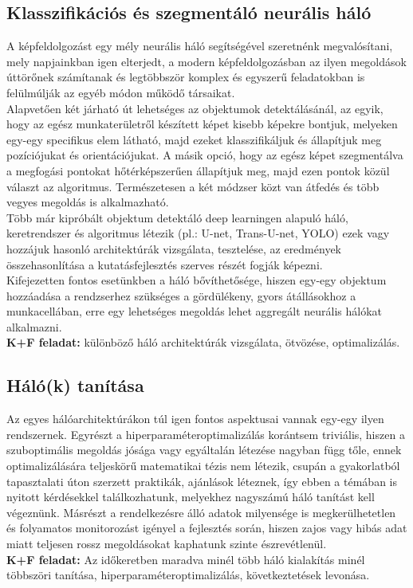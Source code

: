 \documentclass{article}
\begin{document}
\subsection{Klasszifikációs és szegmentáló neurális háló}
A képfeldolgozást egy mély neurális háló segítségével szeretnénk megvalósítani, mely napjainkban
igen elterjedt, a modern képfeldolgozásban az ilyen megoldások úttörőnek számítanak és 
legtöbbször komplex és egyszerű feladatokban is felülmúlják az egyéb módon működő társaikat.\\
Alapvetően két járható út lehetséges az objektumok detektálásánál, az egyik, hogy az egész
munkaterületről készített képet kisebb képekre bontjuk, melyeken egy-egy specifikus elem
látható, majd ezeket klasszifikáljuk és állapítjuk meg pozíciójukat és orientációjukat. A
másik opció, hogy az egész képet szegmentálva a megfogási pontokat hőtérképszerűen állapítjuk meg,
majd ezen pontok közül választ az algoritmus. Természetesen a két módzser közt van átfedés 
és több vegyes megoldás is alkalmazható.\\
Több már kipróbált objektum detektáló deep learningen alapuló háló, keretrendszer és algoritmus
létezik (pl.: U-net, Trans-U-net, YOLO) ezek vagy hozzájuk hasonló architektúrák vizsgálata,
tesztelése, az eredmények összehasonlítása a kutatásfejlesztés szerves részét fogják képezni.\\
Kifejezetten fontos esetünkben a háló bővíthetősége, hiszen egy-egy objektum hozzáadása a
rendzserhez szükséges a gördülékeny, gyors átállásokhoz a munkacellában, erre egy lehetséges megoldás 
lehet aggregált neurális hálókat alkalmazni.\\
\textbf{K+F feladat: }különböző háló architektúrák vizsgálata, ötvözése, optimalizálás.
\subsection{Háló(k) tanítása}
Az egyes hálóarchitektúrákon túl igen fontos aspektusai vannak egy-egy ilyen rendszernek.
Egyrészt a hiperparaméteroptimalizálás korántsem triviális, hiszen a szuboptimális megoldás jósága
vagy egyáltalán létezése nagyban függ tőle, ennek optimalizálására teljeskörű matematikai
tézis nem létezik, csupán a gyakorlatból tapasztalati úton szerzett praktikák, ajánlások léteznek, így
ebben a témában is nyitott kérdésekkel találkozhatunk, melyekhez nagyszámú háló tanítást
kell végeznünk. Másrészt a rendelkezésre álló adatok milyensége is megkerülhetetlen és folyamatos
monitorozást igényel a fejlesztés során, hiszen zajos vagy hibás adat miatt teljesen rossz
megoldásokat kaphatunk szinte észrevétlenül.\vspace{5pt}\\
\textbf{K+F feladat: }Az időkeretben maradva minél több háló kialakítás minél többszöri tanítása,
hiperparaméteroptimalizálás, következtetések levonása.
\end{document}
